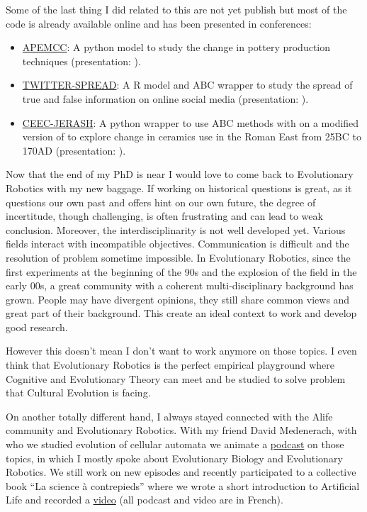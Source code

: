\documentclass[10pt]{article}
\begin{document}
Some of the last thing I did related to this are not yet publish but most of the code is already available online and has been presented in conferences:
\begin{itemize}
    \item \href{https://github.com/simoncarrignon/apemcc}{APEMCC}: A python model to study the change in pottery production techniques (presentation: \cite{COTOSARMIENTO2018}).
    \item \href{http://framagit.org/sc/twitter-spread/}{TWITTER-SPREAD}: A R model and ABC wrapper to study the spread of true and false information on online social media (presentation: \cite{carrignon2018}).
    \item \href{https://framagit.org/sc/abc-pandora}{CEEC-JERASH}: A python wrapper to use ABC methods with on a modified version of \cite{carrignon2015modelingthecoevolutionoftradeandcultureinpastsocieties} to explore change in ceramics use in the Roman East from 25BC to 170AD (presentation: \cite{carrignon2018abmtrac}).
\end{itemize}

Now that the end of my PhD is near I would love to come back to Evolutionary Robotics with my new baggage. If working on historical questions is great, as it questions our own past and offers hint on our own future, the degree of incertitude, though challenging, is often frustrating and can lead to weak conclusion. Moreover, the interdisciplinarity is not well developed yet. Various fields interact with incompatible objectives. Communication is difficult and the resolution of problem sometime impossible. In Evolutionary Robotics, since the first experiments at the beginning of the 90s and the explosion of the field in the early 00s, a great community with a coherent multi-disciplinary background has grown. People may have divergent opinions, they still share common views and great part of their background. This create an ideal context to work and develop good research.

However this doesn't mean I don't want to work anymore on those topics. I even think that Evolutionary Robotics is the perfect empirical playground where Cognitive and Evolutionary Theory can meet and be studied to solve problem that Cultural Evolution is facing.

On another totally different hand, I always stayed connected with the Alife community and Evolutionary Robotics. With my friend David Medenerach, with who we studied evolution of cellular automata \cite{medernach2015evolutionary,medernach2016evolution} we animate a \href{www.vie-artificielle.com}{podcast} on those topics, in which I mostly spoke about Evolutionary Biology and Evolutionary Robotics. We still work on new episodes and recently participated to a collective book ``La science à contrepieds'' where we wrote a short introduction to  Artificial Life and recorded a \href{https://www.youtube.com/watch?v=HBhrmlXNqM4}{video} (all podcast and video are in French).
\end{document}

